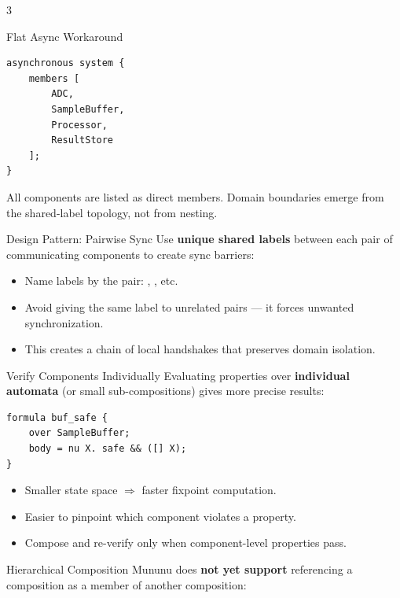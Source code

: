\begin{multicols}{3}
\begin{cheatbox}{Flat Async Workaround}
\begin{lstlisting}[style=ctxdsl]
asynchronous system {
    members [
        ADC,
        SampleBuffer,
        Processor,
        ResultStore
    ];
}
\end{lstlisting}

All components are listed as direct members. Domain
boundaries emerge from the shared-label topology, not from
nesting.
\end{cheatbox}

\begin{tipbox}{Design Pattern: Pairwise Sync}
Use \textbf{unique shared labels} between each pair of
communicating components to create sync barriers:

\begin{itemize}
  \item Name labels by the pair: ,
        , etc.
  \item Avoid giving the same label to unrelated pairs ---
        it forces unwanted synchronization.
  \item This creates a chain of local handshakes that
        preserves domain isolation.
\end{itemize}
\end{tipbox}

\columnbreak


\begin{cheatbox}{Verify Components Individually}
Evaluating properties over \textbf{individual automata}
(or small sub-compositions) gives more precise results:

\begin{lstlisting}[style=ctxdsl]
formula buf_safe {
    over SampleBuffer;
    body = nu X. safe && ([] X);
}
\end{lstlisting}

\begin{itemize}
  \item Smaller state space $\Rightarrow$ faster fixpoint
        computation.
  \item Easier to pinpoint which component violates a
        property.
  \item Compose and re-verify only when component-level
        properties pass.
\end{itemize}
\end{cheatbox}

\begin{warnbox}{Hierarchical Composition}
Mununu does \textbf{not yet support} referencing a
composition as a member of another composition:


\end{warnbox}
\end{multicols}
